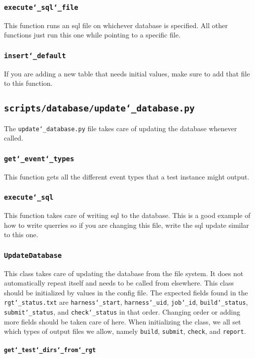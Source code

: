\documentclass{article}
\newcommand{\un}[0]{\char`_}
\begin{document}
\subsubsection{\texttt{execute\un sql\un file}}

This function runs an sql file on whichever database is specified. All other functions just run this one while pointing to a specific file.

\subsubsection{\texttt{insert\un default}}

If you are adding a new table that needs initial values, make sure to add that file to this function.

\subsection{\texttt{scripts/database/update\un database.py}}

The \texttt{update\un database.py} file takes care of updating the database whenever called.

\subsubsection{\texttt{get\un event\un types}}

This function gets all the different event types that a test instance might output.

\subsubsection{\texttt{execute\un sql}}

This function takes care of writing sql to the database. This is a good example of how to write querries so if you are changing this file, write the sql update similar to this one.

\subsubsection{\texttt{UpdateDatabase}}

This class takes care of updating the database from the file system. It does not automatically repeat itself and needs to be called from elsewhere. This class should be initialized by values in the config file. The expected fields found in the \texttt{rgt\un status.txt} are \texttt{harness\un start}, \texttt{harness\un uid}, \texttt{job\un id}, \texttt{build\un status}, \texttt{submit\un status}, and \texttt{check\un status} in that order. Changing order or adding more fields should be taken care of here. When initializing the class, we all set which types of output files we allow, namely \texttt{build}, \texttt{submit}, \texttt{check}, and \texttt{report}.

\paragraph{\texttt{get\un test\un dirs\un from\un rgt}}
\end{document}
